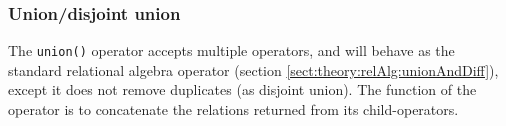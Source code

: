 \subsubsection{Union/disjoint union}
The \texttt{union()} operator accepts multiple operators, and will behave as the standard relational algebra
operator (section \ref{sect:theory:relAlg:unionAndDiff}), except it does not remove duplicates (as disjoint
union). The function of the operator is to concatenate the relations returned from its child-operators.